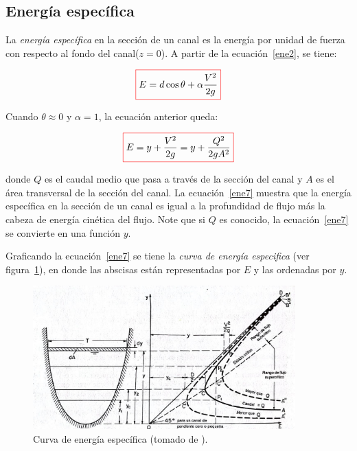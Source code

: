 \documentclass[11pt, oneside]{article}
\begin{document}
\subsection{Energ\'ia espec\'ifica}
La \emph{energ\'ia espec\'ifica} en la secci\'on de un canal es la energ\'ia por unidad de fuerza con respecto al fondo del canal($z=0$). A partir de la ecuaci\'on~\ref{ene2}, se tiene:

\begin{equation}
\color{red}\boxed{\color{black} E =   d\cos \theta + \alpha\frac{V^2}{2g}}
\label{ene6}
\end{equation}

Cuando $\theta \approx 0$ y $\alpha = 1$, la ecuaci\'on anterior queda:
 
\begin{equation}
\color{red}\boxed{\color{black} E =   y  + \frac{V^2}{2g} = y + \frac{Q^2}{2g A^2 }}
\label{ene7}
\end{equation}

donde $Q$ es el caudal medio que pasa a trav\'es de la secci\'on del canal y $A$ es el \'area transversal de la secci\'on del canal. La ecuaci\'on~\ref{ene7} muestra que la energ\'ia espec\'ifica en la secci\'on de un canal es igual a la profundidad de flujo m\'as la cabeza de energ\'ia cin\'etica del flujo. Note que si $Q$ es conocido, la ecuaci\'on~\ref{ene7} se convierte en  una  funci\'on $y$.

Graficando la ecuaci\'on~\ref{ene7} se tiene la \emph{curva de energ\'ia especifica} (ver figura~\ref{fig10}), en donde las abscisas est\'an representadas por $E$ y las ordenadas por $y$.
\begin{figure}[h]
\centering
\includegraphics[width=0.9\textwidth]{fig32.jpeg}
\caption{Curva de energ\'ia espec\'ifica (tomado de \cite{VChow}).}
\label{fig10}
\end{figure}
\end{document}
